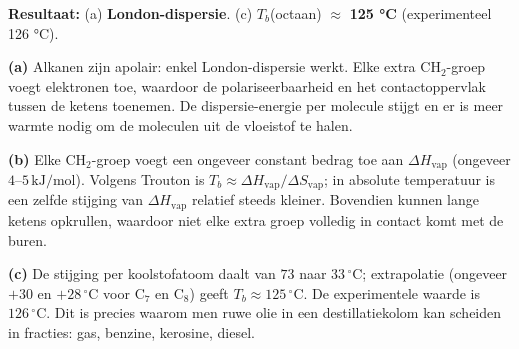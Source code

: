\begin{oplossing}
\textbf{Resultaat:} (a) \textbf{London-dispersie}. (c) \(T_b\)(octaan) \ensuremath{\approx{}} \textbf{125 °C} (experimenteel 126 °C).

\textbf{(a)} Alkanen zijn apolair: enkel London-dispersie werkt. Elke extra \(\mathrm{CH_2}\)-groep voegt elektronen toe, waardoor de polariseerbaarheid en het contactoppervlak tussen de ketens toenemen. De dispersie-energie per molecule stijgt en er is meer warmte nodig om de moleculen uit de vloeistof te halen.

\textbf{(b)} Elke \(\mathrm{CH_2}\)-groep voegt een ongeveer constant bedrag toe aan \(\Delta H_{\text{vap}}\) (ongeveer \(4\)--\(5\,\mathrm{kJ/mol}\)). Volgens Trouton is \(T_b \approx \Delta H_{\text{vap}}/\Delta S_{\text{vap}}\); in absolute temperatuur is een zelfde stijging van \(\Delta H_{\text{vap}}\) relatief steeds kleiner. Bovendien kunnen lange ketens opkrullen, waardoor niet elke extra groep volledig in contact komt met de buren.

\textbf{(c)} De stijging per koolstofatoom daalt van \(73\) naar \(33\,^\circ\mathrm{C}\); extrapolatie (ongeveer \(+30\) en \(+28\,^\circ\mathrm{C}\) voor \(\mathrm{C_7}\) en \(\mathrm{C_8}\)) geeft \(T_b \approx 125\,^\circ\mathrm{C}\). De experimentele waarde is \(126\,^\circ\mathrm{C}\). Dit is precies waarom men ruwe olie in een destillatiekolom kan scheiden in fracties: gas, benzine, kerosine, diesel.
\end{oplossing}

